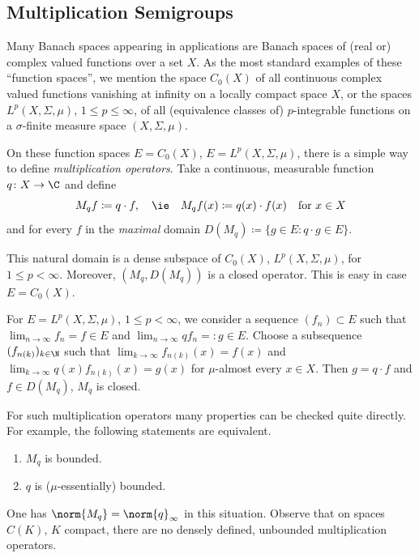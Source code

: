 \subsection{Multiplication Semigroups}\label{subsec:a1-2.3}%
Many Banach spaces appearing in applications are Banach spaces of (real or) complex valued functions over a set $X$.
As the most standard examples of these \enquote{function spaces}, we mention the space $C_{0}(X)$ of all continuous complex valued functions vanishing at infinity on a locally compact space $X$, or the spaces $L^{p}(X,\Sigma,\mu)$, $1 \leq p \leq \infty$, of all (equivalence classes of) $p$-integrable functions on a $\sigma$-finite measure space $(X,\Sigma,\mu)$.

On these function spaces $E = C_{0}(X)$, \resp $E = L^{p}(X,\Sigma,\mu)$, there is a simple way to define \emph{multiplication operators}.
Take a continuous, \resp measurable function $q \colon X \to \C$ and define
\[
    M_{q}f \coloneqq q \cdot f, \quad \text{\ie} \quad M_{q}f(x) 
    \coloneqq q(x) 	\cdot f(x) \quad \text{for } x \in X 
\]
and for every $f$ in the \emph{maximal} domain $D(M_{q}) \coloneqq \{g \in E \colon q \cdot g \in E\}$.

This natural domain is a dense subspace of\/ $C_{0}(X)$, \resp $L^{p}(X,\Sigma,\mu)$, for $1 \leq p < \infty$.
Moreover, $(M_{q},D(M_{q}))$ is a closed operator.
This is easy in case $E = C_{0}(X)$.

For $E = L^{p}(X,\Sigma,\mu)$, $1 \leq p < \infty$, we consider a sequence $(f_{n}) \subset E$ such that $\lim_{n \to \infty} f_{n} = f \in E$ and $\lim_{n \to \infty} qf_{n} = \colon g \in E$.
Choose a subsequence $(f_{n(k)})_{k \in \N}$ such that $\lim_{k \to \infty} f_{n(k)}(x) = f(x)$ and $\lim_{k \to \infty} q(x)f_{n(k)}(x) = g(x)$ for $\mu$-almost every $x \in X$.
Then $g = q \cdot f$ and $f \in D(M_{q})$, \ie $M_{q}$ is closed.

For such multiplication operators many properties can be checked quite directly.
For example, the following statements are equivalent.
\begin{enumerate}[\upshape (a)]
\item 
$M_{q}$ is bounded.

\item 
$q$ is ($\mu$-essentially) bounded.
\end{enumerate}
One has $\norm{M_{q}} = \norm{q}_{\infty}$ in this situation.
Observe that on spaces $C(K)$, $K$ compact, there are no densely defined, unbounded multiplication operators.

